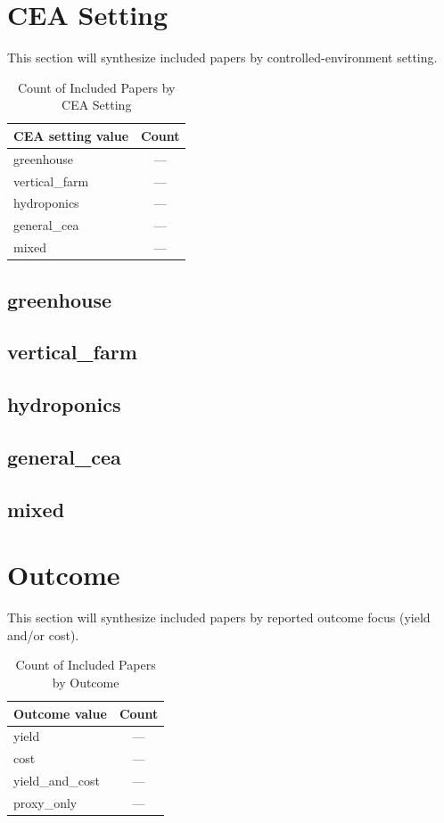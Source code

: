 \documentclass[lettersize,journal]{IEEEtran}
\begin{document}
\section{CEA Setting}
This section will synthesize included papers by controlled-environment setting.

\begin{table}[H]
\caption{Count of Included Papers by CEA Setting}
\label{tab:cea_setting_counts}
\centering
\begin{tabular}{|l|c|}
\hline
CEA setting value & Count\\
\hline
greenhouse & ---\\
vertical\_farm & ---\\
hydroponics & ---\\
general\_cea & ---\\
mixed & ---\\
\hline
\end{tabular}
\end{table}

\subsection{greenhouse}

\subsection{vertical\_farm}

\subsection{hydroponics}

\subsection{general\_cea}

\subsection{mixed}


\section{Outcome}
This section will synthesize included papers by reported outcome focus (yield and/or cost).

\begin{table}[H]
\caption{Count of Included Papers by Outcome}
\label{tab:outcome_counts}
\centering
\begin{tabular}{|l|c|}
\hline
Outcome value & Count\\
\hline
yield & ---\\
cost & ---\\
yield\_and\_cost & ---\\
proxy\_only & ---\\
\hline
\end{tabular}
\end{table}
\end{document}
